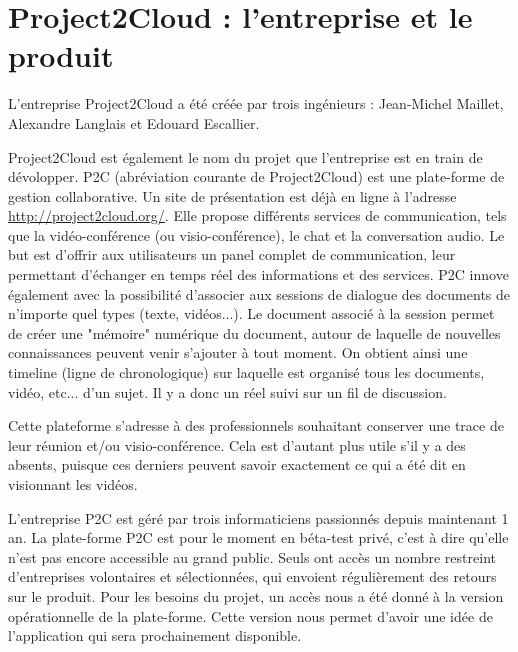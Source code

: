 

	\section{Project2Cloud : l'entreprise et le produit}
	
	L'entreprise Project2Cloud a été créée par trois ingénieurs : Jean-Michel Maillet, Alexandre Langlais et Edouard Escallier.
	
	Project2Cloud est également le nom du projet que l'entreprise est en train de dévolopper. P2C (abréviation courante de Project2Cloud) est une plate-forme de gestion collaborative. Un site de présentation est déjà en ligne à l'adresse \href{http://project2cloud.org/}{http://project2cloud.org/}. Elle propose différents services de communication, tels que la vidéo-conférence (ou visio-conférence), le chat et la conversation audio. Le but est d'offrir aux utilisateurs un panel complet de communication, leur permettant d'échanger en temps réel des informations et des services. P2C innove également avec la possibilité d'associer aux sessions de dialogue des documents de n'importe quel types (texte, vidéos...). Le document associé à la session permet de créer une "mémoire" numérique du document, autour de laquelle de nouvelles connaissances peuvent venir s'ajouter à tout moment. On obtient ainsi une timeline (ligne de chronologique) sur laquelle est organisé tous les documents, vidéo, etc... d'un sujet. Il y a donc un réel suivi sur un fil de discussion.

		
	Cette plateforme s'adresse à des professionnels souhaitant conserver une trace de leur réunion et/ou visio-conférence. Cela est d'autant plus utile s'il y a des absents, puisque ces derniers peuvent savoir exactement ce qui a été dit en visionnant les vidéos.
		

	L'entreprise P2C  est géré par trois informaticiens passionnés depuis maintenant 1 an. La plate-forme P2C est pour le moment en béta-test privé, c'est à dire qu'elle n'est pas encore accessible au grand public. Seuls ont accès un nombre restreint d'entreprises volontaires et sélectionnées, qui envoient régulièrement des retours sur le produit. Pour les besoins du projet, un accès nous a été donné à la version opérationnelle de la plate-forme. Cette version nous permet d'avoir une idée de l'application qui sera prochainement disponible.